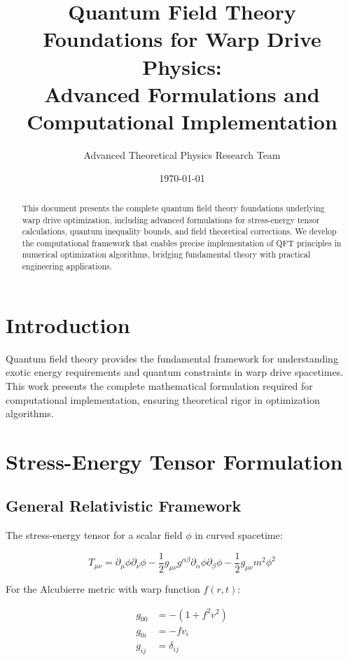 \documentclass[12pt,a4paper]{article}
\title{Quantum Field Theory Foundations for Warp Drive Physics:\\Advanced Formulations and Computational Implementation}
\author{Advanced Theoretical Physics Research Team}
\date{\today}
\begin{document}
\maketitle

\begin{abstract}
This document presents the complete quantum field theory foundations underlying warp drive optimization, including advanced formulations for stress-energy tensor calculations, quantum inequality bounds, and field theoretical corrections. We develop the computational framework that enables precise implementation of QFT principles in numerical optimization algorithms, bridging fundamental theory with practical engineering applications.
\end{abstract}

\section{Introduction}

Quantum field theory provides the fundamental framework for understanding exotic energy requirements and quantum constraints in warp drive spacetimes. This work presents the complete mathematical formulation required for computational implementation, ensuring theoretical rigor in optimization algorithms.

\section{Stress-Energy Tensor Formulation}

\subsection{General Relativistic Framework}

The stress-energy tensor for a scalar field $\phi$ in curved spacetime:

\begin{equation}
T_{\mu\nu} = \partial_\mu \phi \partial_\nu \phi - \frac{1}{2} g_{\mu\nu} g^{\alpha\beta} \partial_\alpha \phi \partial_\beta \phi - \frac{1}{2} g_{\mu\nu} m^2 \phi^2
\end{equation}

For the Alcubierre metric with warp function $f(r,t)$:

\begin{align}
g_{00} &= -(1 + f^2 v^2) \\
g_{0i} &= -f v_i \\
g_{ij} &= \delta_{ij}
\end{align}
\end{document}
